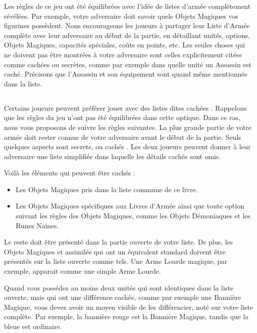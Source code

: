 Les règles de ce jeu ont été équilibrées avec l'idée de listes d'armée complètement révélées. Par exemple, votre adversaire doit savoir quels Objets Magiques vos figurines possèdent. Nous encourageons les joueurs à partager leur Liste d'Armée complète avec leur adversaire au début de la partie, en détaillant unités, options, Objets Magiques, capacités spéciales, coûts en points, etc. Les seules choses qui ne doivent pas être montrées à votre adversaire sont celles explicitement citées comme cachées ou secrètes, comme par exemple dans quelle unité un Assassin est caché. Précisons que l'Assassin et son équipement sont quand même mentionnés dans la liste.

\subsection[Règles optionnelles pour listes cachées]{}
\label{hidden_lists}

Certains joueurs peuvent préférer jouer avec des listes dites \og cachées \fg{}. Rappelons que les règles du jeu n'ont pas été équilibrées dans cette optique. Dans ce cas, nous vous proposons de suivre les règles suivantes. La plus grande partie de votre armée doit rester connue de votre adversaire avant le début de la partie. Seuls quelques aspects sont secrets, ou \og cachés \fg{}. Les deux joueurs peuvent donner à leur adversaire une liste simplifiée dans laquelle les détails cachés sont omis.

Voilà les éléments qui peuvent être cachés : 

\begin{itemize}[label={-}]
\item Les Objets Magiques pris dans la liste commune de ce livre.
\item Les Objets Magiques spécifiques aux Livres d'Armée ainsi que toute option suivant les règles des Objets Magiques, comme les Objets Démoniaques et les Runes Naines.
\end{itemize}

Le reste doit être présenté dans la partie ouverte de votre liste. De plus, les Objets Magiques et assimilés qui ont un équivalent standard doivent être présentés sur la liste ouverte comme tels. Une Arme Lourde magique, par exemple, apparait comme une simple Arme Lourde.

Quand vous possédez au moins deux unités qui sont identiques dans la liste ouverte, mais qui ont une différence cachée, comme par exemple une Bannière Magique, vous devez avoir un moyen visible de les différencier, noté sur votre liste complète. Par exemple, la bannière rouge est la Bannière Magique, tandis que la bleue est ordinaire.


